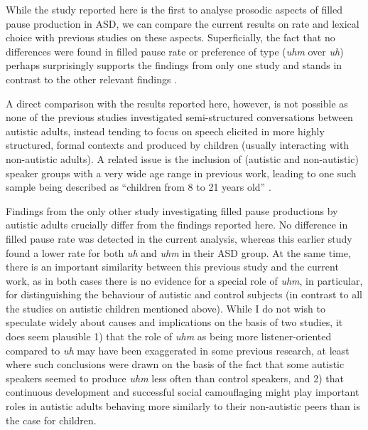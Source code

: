 While the study reported here is the first to analyse prosodic aspects of filled pause production in ASD, we can compare the current results on rate and lexical choice with previous studies on these aspects. Superficially, the fact that no differences were found in filled pause rate or preference of type (\emph{uhm} over \emph{uh}) perhaps surprisingly supports the findings from only one study \citep{suhNarrativePerformanceOptimal2014} and stands in contrast to the other relevant findings \citep{gormanUhUmChildren2016,irvineUhUmAutism2016,jonesItImportantFrequency2022,lakeListenerVsSpeakeroriented2011,lunsfordAutismUseFillers2010,mcgregorBriefReportUm2020,parish-morrisLinguisticCamouflageGirls2017}.

A direct comparison with the results reported here, however, is not possible as none of the previous studies investigated semi-structured conversations between autistic adults, instead tending to focus on speech elicited in more highly structured, formal contexts and produced by children (usually interacting with non-autistic adults). A related issue is the inclusion of (autistic and non-autistic) speaker groups with a very wide age range in previous work, leading to one such sample being described as ``children from 8 to 21 years old” \citep[p. 1684]{suhNarrativePerformanceOptimal2014}.

Findings from the only other study investigating filled pause productions by autistic adults \citep{lakeListenerVsSpeakeroriented2011} crucially differ from the findings reported here. No difference in filled pause rate was detected in the current analysis, whereas this earlier study found a lower rate for both \emph{uh} and \emph{uhm} in their ASD group. At the same time, there is an important similarity between this previous study and the current work, as in both cases there is no evidence for a special role of \emph{uhm}, in particular, for distinguishing the behaviour of autistic and control subjects (in contrast to all the studies on autistic children mentioned above). While I do not wish to speculate widely about causes and implications on the basis of two studies, it does seem plausible 1) that the role of \emph{uhm} as being more listener-oriented compared to \emph{uh} may have been exaggerated in some previous research, at least where such conclusions were drawn on the basis of the fact that some autistic speakers seemed to produce \emph{uhm} less often than control speakers, and 2) that continuous development and successful social camouflaging might play important roles in autistic adults behaving more similarly to their non-autistic peers than is the case for children.

